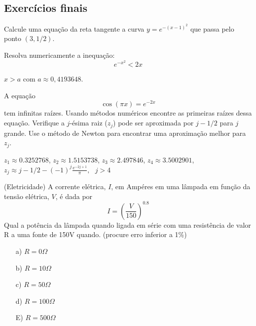 \begin{ex}
\section{Exercícios finais}

\begin{exer} Calcule uma equação da reta tangente a curva $y=e^{-(x-1)^2}$ que passa pelo ponto $(3, 1/2)$.
\end{exer}

\begin{exer} Resolva numericamente a inequação:
  \begin{equation}
    e^{-x^2}<2x
  \end{equation}
\end{exer}
\begin{resp}

    $x>a$ com $a\approx 0,4193648$.

\end{resp}


\begin{exer} A equação \begin{equation} \cos(\pi x)=e^{-2x} \end{equation} tem infinitas raízes.
Usando  métodos numéricos encontre as primeiras raízes dessa equação. Verifique a $j$-ésima raiz ($z_j$) pode ser aproximada por $j-1/2$ para $j$ grande. Use o método de Newton para encontrar uma aproximação melhor para $z_j$.
\end{exer}
\begin{resp}

 $z_1\approx 0.3252768 $, $z_2\approx 1.5153738$, $z_3\approx 2.497846  $, $z_4\approx 3.5002901$, $z_j\approx j-1/2-(-1)^j\frac{e^{-2j+1}}{\pi}, ~~~j>4$

\end{resp}


\begin{exer}(Eletricidade) A corrente elétrica, $I$, em Ampéres em uma lâmpada em função da tensão elétrica, $V$, é dada por
\begin{equation} I=\left(\frac{V}{150}\right)^{0.8} \end{equation}
Qual a potência da lâmpada quando ligada em série com uma resistência de valor R a uma fonte de 150V quando. (procure erro inferior a 1\%)
\begin{itemize}
\item [a)] $R=0\Omega$
\item [b)] $R=10\Omega$
\item [c)] $R=50\Omega$
\item [d)] $R=100\Omega$
\item [E)] $R=500\Omega$
\end{itemize}
\end{exer}
\begin{resp}


\end{resp}
\end{ex}
